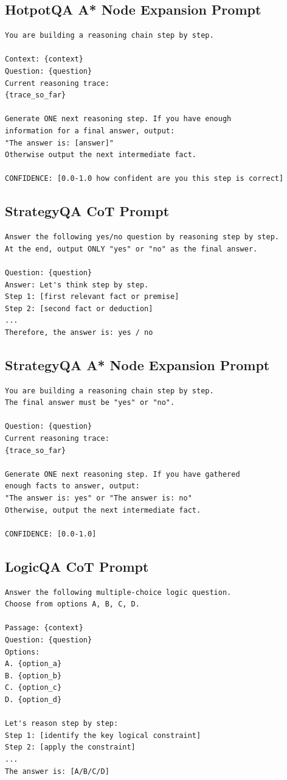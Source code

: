 \documentclass{article}
\begin{document}
\subsection{HotpotQA A* Node Expansion Prompt}
\begin{verbatim}
You are building a reasoning chain step by step.

Context: {context}
Question: {question}
Current reasoning trace:
{trace_so_far}

Generate ONE next reasoning step. If you have enough
information for a final answer, output:
"The answer is: [answer]"
Otherwise output the next intermediate fact.

CONFIDENCE: [0.0-1.0 how confident are you this step is correct]
\end{verbatim}

\subsection{StrategyQA CoT Prompt}
\begin{verbatim}
Answer the following yes/no question by reasoning step by step.
At the end, output ONLY "yes" or "no" as the final answer.

Question: {question}
Answer: Let's think step by step.
Step 1: [first relevant fact or premise]
Step 2: [second fact or deduction]
...
Therefore, the answer is: yes / no
\end{verbatim}

\subsection{StrategyQA A* Node Expansion Prompt}
\begin{verbatim}
You are building a reasoning chain step by step.
The final answer must be "yes" or "no".

Question: {question}
Current reasoning trace:
{trace_so_far}

Generate ONE next reasoning step. If you have gathered
enough facts to answer, output:
"The answer is: yes" or "The answer is: no"
Otherwise, output the next intermediate fact.

CONFIDENCE: [0.0-1.0]
\end{verbatim}

\subsection{LogicQA CoT Prompt}
\begin{verbatim}
Answer the following multiple-choice logic question.
Choose from options A, B, C, D.

Passage: {context}
Question: {question}
Options:
A. {option_a}
B. {option_b}
C. {option_c}
D. {option_d}

Let's reason step by step:
Step 1: [identify the key logical constraint]
Step 2: [apply the constraint]
...
The answer is: [A/B/C/D]
\end{verbatim}
\end{document}
